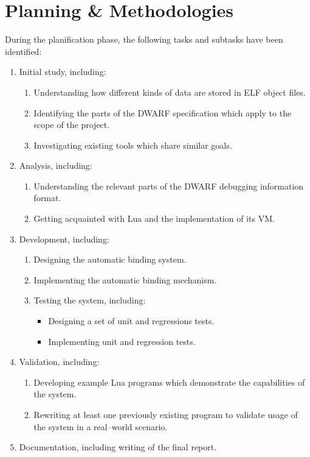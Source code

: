 \section{Planning \& Methodologies}
	\label{sec:plan-method}

During the planification phase, the following tasks and subtasks have been
identified:

\begin{enumerate}
	\item Initial study, including:
		\begin{enumerate}
			\item Understanding how different kinds of data are stored in \gls{ELF}
				object files.
			\item Identifying the parts of the \gls{DWARF} specification which apply
				to the scope of the project.
			\item Investigating existing tools which share similar goals.
		\end{enumerate}

	\item Analysis, including:
		\begin{enumerate}
			\item Understanding the relevant parts of the \gls{DWARF}
				debugging information format.
			\item Getting acquainted with Lua and the implementation
				of its \gls{VM}.
		\end{enumerate}

	\item Development, including:
		\begin{enumerate}
			\item Designing the automatic binding system.
			\item Implementing the automatic binding mechanism.
			\item Testing the system, including:
				\begin{itemize}
					\item Designing a set of unit and regressions tests.
					\item Implementing unit and regression tests.
				\end{itemize}
		\end{enumerate}

	\item Validation, including:
		\begin{enumerate}
			\item Developing example Lua programs which demonstrate the
				capabilities of the system.
			\item Rewriting at least one previously existing program to
				validate usage of the system in a real--world scenario.
		\end{enumerate}

	\item Documentation, including writing of the final report.
\end{enumerate}

